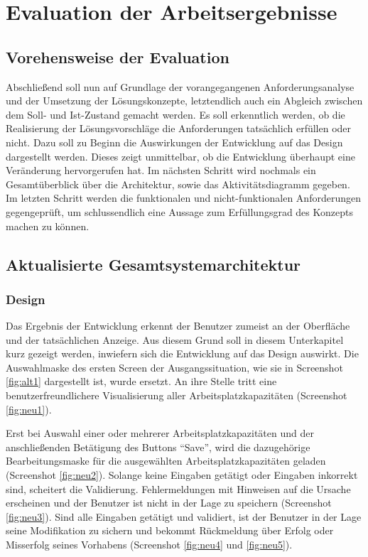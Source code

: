 \chapter{Evaluation der Arbeitsergebnisse}
\section{Vorehensweise der Evaluation}
Abschließend soll nun auf Grundlage der vorangegangenen Anforderungsanalyse und der Umsetzung der Lösungskonzepte, letztendlich auch ein Abgleich zwischen dem Soll- und Ist-Zustand gemacht werden. Es soll erkenntlich werden, ob die Realisierung der Lösungsvorschläge die Anforderungen tatsächlich erfüllen oder nicht. Dazu soll zu Beginn die Auswirkungen der Entwicklung auf das Design dargestellt werden. Dieses zeigt unmittelbar, ob die Entwicklung überhaupt eine Veränderung hervorgerufen hat. Im nächsten Schritt wird nochmals ein Gesamtüberblick über die Architektur, sowie das Aktivitätsdiagramm gegeben. Im letzten Schritt werden die funktionalen und nicht-funktionalen Anforderungen gegengeprüft, um schlussendlich eine Aussage zum Erfüllungsgrad des Konzepts machen zu können.
% 
% 
% 
% 
% 
% 
\section{Aktualisierte Gesamtsystemarchitektur}
\subsection{Design}
Das Ergebnis der Entwicklung erkennt der Benutzer zumeist an der Oberfläche und der tatsächlichen Anzeige. Aus diesem Grund soll in diesem Unterkapitel kurz gezeigt werden, inwiefern sich die Entwicklung auf das Design auswirkt. Die Auswahlmaske des ersten Screen der Ausgangssituation, wie sie in Screenshot \ref{fig:alt1} dargestellt ist, wurde ersetzt. An ihre Stelle tritt eine benutzerfreundlichere Visualisierung aller Arbeitsplatzkapazitäten (Screenshot \ref{fig:neu1}).

Erst bei Auswahl einer oder mehrerer Arbeitsplatzkapazitäten und der anschließenden Betätigung des Buttons \enquote{Save}, wird die dazugehörige Bearbeitungsmaske für die ausgewählten Arbeitsplatzkapazitäten geladen (Screenshot \ref{fig:neu2}). Solange keine Eingaben getätigt oder Eingaben inkorrekt sind, scheitert die Validierung. Fehlermeldungen mit Hinweisen auf die Ursache erscheinen und der Benutzer ist nicht in der Lage zu speichern (Screenshot \ref{fig:neu3}). Sind alle Eingaben getätigt und validiert, ist der Benutzer in der Lage seine Modifikation zu sichern und bekommt Rückmeldung über Erfolg oder Misserfolg seines Vorhabens (Screenshot \ref{fig:neu4} und \ref{fig:neu5}).

